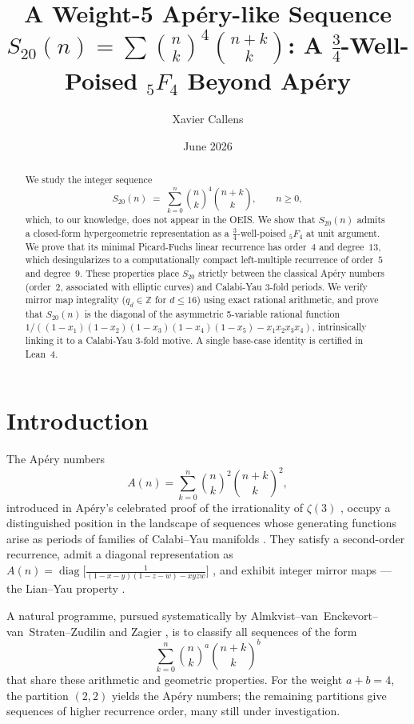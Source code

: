 \documentclass[12pt,reqno]{amsart}
\title[A Weight-5 Apéry-like Sequence]{A Weight-5 Apéry-like Sequence $S_{20}(n) = \sum \binom{n}{k}^4 \binom{n+k}{k}$:
A $\frac{3}{4}$-Well-Poised ${}_5F_4$ Beyond Ap\'ery}
\author{Xavier Callens}
\date{June 2026}
\theoremstyle{plain}
\theoremstyle{definition}
\theoremstyle{remark}
\newcommand{\ZZ}{\mathbb{Z}}
\newcommand{\pFq}[2]{{}_{#1}F_{#2}}
\DeclareMathOperator{\diag}{diag}
\begin{document}
\begin{abstract}
We study the integer sequence
\[
S_{20}(n) \;=\; \sum_{k=0}^{n} \binom{n}{k}^{\!4}\binom{n+k}{k},
\qquad n \ge 0,
\]
which, to our knowledge, does not appear in the OEIS.
We show that $S_{20}(n)$ admits a closed-form
hypergeometric representation as a $\tfrac{3}{4}$-well-poised
$\pFq{5}{4}$ at unit argument. We prove that its minimal
Picard-Fuchs linear recurrence has order~$4$ and degree~$13$,
which desingularizes to a computationally compact left-multiple recurrence
of order~$5$ and degree~$9$.
These properties place $S_{20}$ strictly between the classical
Ap\'ery numbers (order~$2$, associated with elliptic curves) and
Calabi-Yau 3-fold periods. We verify mirror map integrality
($q_d \in \ZZ$ for $d \le 16$) using exact rational arithmetic, and prove that
$S_{20}(n)$ is the diagonal of the asymmetric 5-variable rational function
$1 / ((1-x_1)(1-x_2)(1-x_3)(1-x_4)(1-x_5) - x_1 x_2 x_3 x_4)$,
intrinsically linking it to a Calabi-Yau 3-fold motive.
A single base-case identity is certified in Lean~4.
\end{abstract}

\maketitle

\section{Introduction}\label{sec:intro}

The Ap\'ery numbers
\[
A(n) = \sum_{k=0}^{n} \binom{n}{k}^2 \binom{n+k}{k}^2,
\]
introduced in Ap\'ery's celebrated proof of the irrationality
of $\zeta(3)$ \cite{Apery1979,vanderPoorten1979}, occupy a
distinguished position in the landscape of sequences
whose generating functions arise as periods of families of
Calabi--Yau manifolds \cite{AESZ,Zagier2009}.
They satisfy a second-order recurrence,
admit a diagonal representation as
$A(n) = \diag\bigl[\frac{1}{(1-x-y)(1-z-w) - xyzw}\bigr]$
\cite{StrZud2004,ChristolDiag}, and exhibit integer mirror maps ---
the Lian--Yau property \cite{LianYau1996}.

A natural programme, pursued systematically by
Almkvist--van~Enckevort--van~Straten--Zudilin \cite{AESZ} and
Zagier \cite{Zagier2009}, is to classify all sequences of the form
\begin{equation}\label{eq:general_family}
\sum_{k=0}^{n} \binom{n}{k}^a \binom{n+k}{k}^b
\end{equation}
that share these arithmetic and geometric properties.
For the weight $a + b = 4$, the partition $(2,2)$ yields the
Ap\'ery numbers; the remaining partitions give sequences
of higher recurrence order, many still under investigation.
\end{document}
